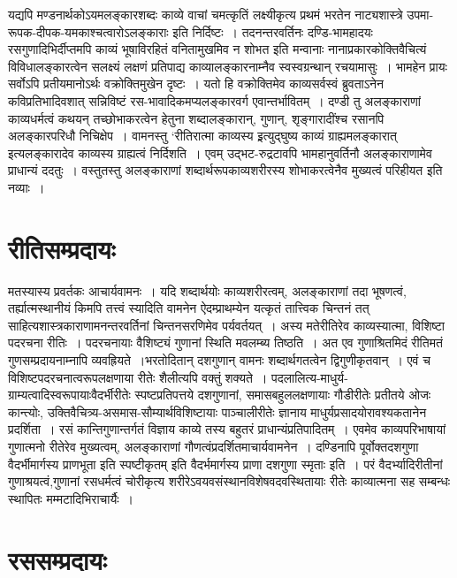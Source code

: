 {यद्यपि मण्डनार्थकोऽयमलङ्कारशब्दः काव्ये वाचां चमत्कृतिं लक्ष्यीकृत्य प्रथमं भरतेन नाट्यशास्त्रे उपमा-रूपक-दीपक-यमकाश्चत्वारोऽलङ्काराः इति निर्दिष्टः~। तदनन्तरवर्तिनः दण्डि-भामहादयः रसगुणादिभिर्दीप्तमपि काव्यं भूषाविरहितं वनितामुखमिव न शोभत इति मन्वानाः नानाप्रकारकोक्तिवैचित्यं विविधालङ्कारत्वेन सलक्ष्यं लक्षणं प्रतिपाद्य काव्यालङ्कारनाम्नैव स्वस्वग्रन्थान् रचयामासुः~। भामहेन प्रायः सर्वोऽपि प्रतीयमानोऽर्थः वक्रोक्तिमुखेन दृष्टः~। यतो हि वक्रोक्तिमेव काव्यसर्वस्वं ब्रुवताऽनेन कविप्रतिभादिवशात् सन्निविष्टं रस-भावादिकमप्यलङ्कारवर्ग एवान्तर्भावितम्~। दण्डी तु अलङ्काराणां काव्यधर्मत्वं कथयन् तच्छोभाकरत्वेन हेतुना शब्दालङ्कारान्, गुणान्, शृङ्गारादींश्च रसानपि अलङ्कारपरिधौ निचिक्षेप~। वामनस्तु ‘रीतिरात्मा काव्यस्य इ्रत्युद्घुष्य काव्यं ग्राह्यमलङ्कारात् इत्यलङ्कारादेव काव्यस्य ग्राह्यत्वं निर्दिशति~।   एवम् उद्भट-रुद्रटावपि भामहानुवर्तिनौ अलङ्काराणामेव प्राधान्यं ददतुः~। वस्तुतस्तु अलङ्काराणां शब्दार्थरूपकाव्यशरीरस्य  शोभाकरत्वेनैव मुख्यत्वं परिहीयत इति नव्याः~। 

\section*{ रीतिसम्प्रदायः}

मतस्यास्य प्रवर्तकः आचार्यवामनः~। यदि शब्दार्थयोः काव्यशरीरत्वम्, अलङ्काराणां तदा\-	भूषणत्वं, तर्ह्यात्मस्थानीयं किमपि तत्त्वं स्यादिति वामनेन ऐदम्प्राथम्येन यत्कृतं तात्त्विक\- चिन्तनं तत् साहित्यशास्त्रकाराणामनन्तरवर्तिनां चिन्तनसरणिमेव पर्यवर्तयत्~। अस्य मते\break रीतिरेव काव्यस्यात्मा, विशिष्टा पदरचना रीतिः~। पदरचनायाः वैशिष्ट्यं गुणानां स्थिति\- मवलम्ब्य तिष्ठति~। अत एव गुणाश्रितमिदं रीतिमतं गुणसम्प्रदायनाम्नापि व्यवह्रियते~।\break भरतोदितान् दशगुणान् वामनः शब्दार्थगतत्वेन द्विगुणीकृतवान्~। एवं च विशिष्टपदरचनात्वरूपलक्षणाया रीतेः शैलीत्यपि वक्तुं शक्यते~। पदलालित्य-माधुर्य-ग्राम्यत्वादिस्वरूपायाः\break वैदर्भीरीतेः स्पष्टप्रतिपत्तये दशगुणानां, समासबहुललक्षणायाः गौडीरीतेः प्रतीतये ओजः \break कान्त्योः, उक्तिवैचित्र्य-असमास-सौम्यार्थविशिष्टायाः पाञ्चालीरीतेः ज्ञानाय माधुर्यप्रसादयोरावश्यकतानेन प्रदर्शिता~। रसं कान्तिगुणान्तर्गतं विज्ञाय काव्ये तस्य बहुतरं प्राधान्यं\break प्रतिपादितम्~। एवमेव काव्यपरिभाषायां गुणात्मनो रीतेरेव मुख्यत्वम्, अलङ्काराणां गौणत्वं\break प्रदर्शितमाचार्यवामनेन~। दण्डिनापि पूर्वोक्तदशगुणा वैदर्भीमार्गस्य प्राणभूता इति स्पष्टीकृतम् इति वैदर्भमार्गस्य प्राणा दशगुणा स्मृताः इति~। परं वैदर्भ्यादिरीतीनां गुणाश्रयत्वं,\break गुणानां रसधर्मत्वं चोरीकृत्य शरीरेऽवयवसंस्थानविशेषवदवस्थितायाः रीतेः काव्यात्मना सह सम्बन्धः स्थापितः मम्मटादिभिराचार्यैः~। 

\section*{ रससम्प्रदायः}

}
